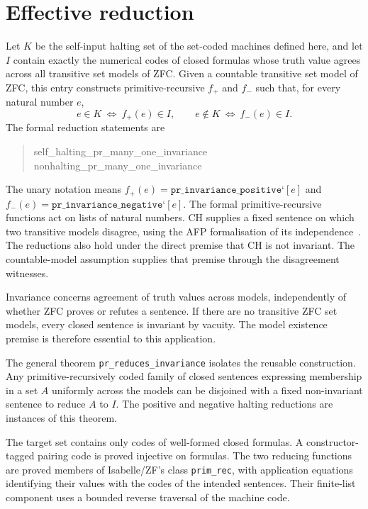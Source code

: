 \documentclass[11pt,a4paper]{article}
\newcommand{\theoremname}[1]{{\urlstyle{tt}\nolinkurl{#1}}}
\begin{document}
\section{Effective reduction}
Let $K$ be the self-input halting set of the set-coded machines defined here,
and let $I$ contain exactly the numerical codes of closed formulas whose
truth value agrees across all transitive set models of ZFC. Given a
countable transitive set model of ZFC, this entry constructs
primitive-recursive $f_+$ and $f_-$ such that, for every natural number $e$,
\[
  e\in K\ \Longleftrightarrow\ f_+(e)\in I,
  \qquad
  e\notin K\ \Longleftrightarrow\ f_-(e)\in I.
\]
The formal reduction statements are
\begin{quote}
\small\ttfamily
self\_halting\_pr\_many\_one\_invariance\\
nonhalting\_pr\_many\_one\_invariance
\end{quote}
The unary notation means
$f_+(e)=\texttt{pr\_invariance\_positive}\mathbin{\texttt{`}}[e]$ and
$f_-(e)=\texttt{pr\_invariance\_negative}\mathbin{\texttt{`}}[e]$.
The formal primitive-recursive functions act on lists of natural numbers.
CH supplies a fixed sentence on which two transitive models
disagree, using the AFP formalisation of its independence~\cite{afp-ch}.
The reductions also hold under the direct premise that CH is not invariant.
The countable-model assumption supplies that premise through the
disagreement witnesses.

Invariance concerns agreement of truth values across models, independently
of whether ZFC proves or refutes a sentence. If there are no transitive ZFC
set models, every closed sentence is invariant by vacuity. The model
existence premise is therefore essential to this application.

The general theorem \theoremname{pr_reduces_invariance} isolates the
reusable construction. Any primitive-recursively coded family of closed
sentences expressing membership in a set $A$ uniformly across the models
can be disjoined with a fixed non-invariant sentence to reduce $A$ to $I$.
The positive and negative halting reductions are instances of this theorem.

The target set contains only codes of well-formed closed formulas. A
constructor-tagged pairing code is proved injective on formulas. The two
reducing functions are proved members of Isabelle/ZF's class
\texttt{prim\_rec}, with application equations identifying their values
with the codes of the intended sentences. Their finite-list component uses
a bounded reverse traversal of the machine code.
\end{document}
